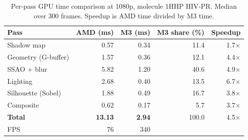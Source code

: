 \begin{table}[H]
    \centering
    \small
    \begin{tabular}{lrrrr}
        \toprule
        Pass & AMD (ms) & M3 (ms) & M3 share (\%) & Speedup \\
        \midrule
        Shadow map & 0.57 & 0.34 & 11.4 & 1.7$\times$ \\
        Geometry (G-buffer) & 1.57 & 0.36 & 12.1 & 4.4$\times$ \\
        SSAO + blur & 5.82 & 1.20 & 40.6 & 4.9$\times$ \\
        Lighting & 2.68 & 0.40 & 13.5 & 6.7$\times$ \\
        Silhouette (Sobel) & 1.88 & 0.49 & 16.7 & 3.8$\times$ \\
        Composite & 0.62 & 0.17 & 5.7 & 3.7$\times$ \\
        \midrule
        \textbf{Total} & \textbf{13.13} & \textbf{2.94} & 100.0 & 4.5$\times$ \\
        FPS & 76 & 340 & & \\
        \bottomrule
    \end{tabular}
    \caption{Per-pass GPU time comparison at 1080p, molecule 1HHP HIV-PR. Median over 300 frames. Speedup is AMD time divided by M3 time.}
    \label{tab:compare_perpass}
\end{table}
